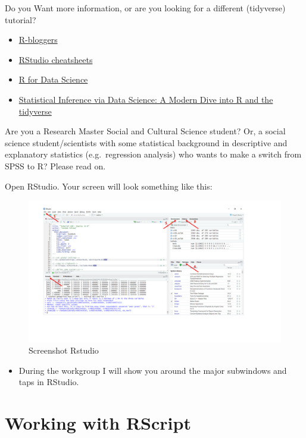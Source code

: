 \documentclass[
]{book}
\providecommand{\tightlist}{%
  \setlength{\itemsep}{0pt}\setlength{\parskip}{0pt}}
\begin{document}
Do you Want more information, or are you looking for a different (tidyverse) tutorial?

\begin{itemize}
\tightlist
\item
  \href{https://www.r-bloggers.com/how-to-learn-r-2/}{R-bloggers}
\item
  \href{https://www.rstudio.com/resources/cheatsheets/}{RStudio cheatsheets}
\item
  \href{http://r4ds.had.co.nz/}{R for Data Science}
\item
  \href{https://www.moderndive.com/}{Statistical Inference via Data Science: A Modern Dive into R and the tidyverse}
\end{itemize}

Are you a Research Master Social and Cultural Science student? Or, a social science student/scientists with some statistical background in descriptive and explanatory statistics (e.g.~regression analysis) who wants to make a switch from SPSS to R? Please read on.

Open RStudio. Your screen will look something like this:

\begin{figure}
\includegraphics[width=1\linewidth]{screenshot} \caption{Screenshot Rstudio}\label{fig:screenshot}
\end{figure}

\begin{itemize}
\tightlist
\item
  During the workgroup I will show you around the major subwindows and taps in RStudio.
\end{itemize}

\hypertarget{working-with-rscript}{%
\section{Working with RScript}\label{working-with-rscript}}
\end{document}
